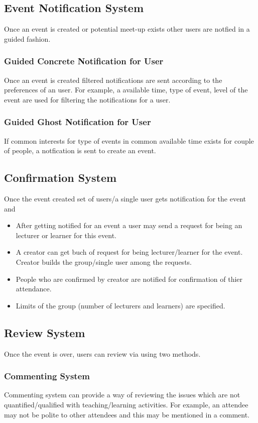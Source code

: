  \subsection{Event Notification System} Once an event is created or potential meet-up exists other users are notfied in a guided fashion.
 \subsubsection{Guided Concrete Notification for User} Once an event is created filtered notifications are sent according to the preferences of an user. For example, a available time, type of event, level of the event are used for filtering the notifications for a user.
 \subsubsection{Guided Ghost Notification for User} If common interests for type of events in common available time exists for couple of  people, a notfication is sent to create an event.
 \subsection{Confirmation System} 
 Once the event created set of users/a single user gets notification for the event and
 \begin{itemize}
 \item After getting notified for an event a user may send a request for being an lecturer or learner for this event.
 \item A creator can get buch of request for being lecturer/learner for the event. Creator builds the group/single user among the requests.
   \item People who are confirmed by creator are notified for confirmation of thier attendance.
   \item Limits of the group (number of lecturers and learners) are specified.
   \end{itemize}
 \subsection{Review System}
 Once the event is over, users can review via using two methods.
 \subsubsection{Commenting System} Commenting system can provide a way of reviewing the issues which are not quantified/qualified with teaching/learning activities. For example, an attendee may not be polite to other attendees and this may be mentioned in a comment. 
